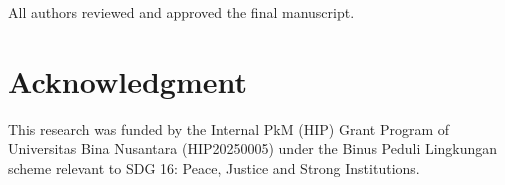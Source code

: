 \documentclass[conference,a4paper]{IEEEtran}
\begin{document}




All authors reviewed and approved the final manuscript.

\section*{Acknowledgment}

This research was funded by the Internal PkM (HIP) Grant Program of Universitas Bina Nusantara (HIP20250005) under the Binus Peduli Lingkungan scheme relevant to SDG 16: Peace, Justice and Strong Institutions.
\end{document}
